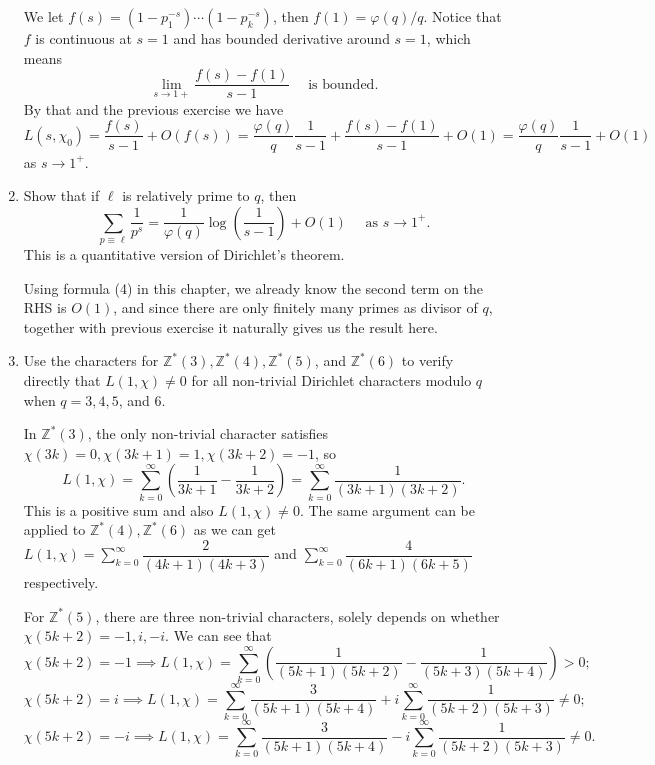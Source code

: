 \documentclass{article}
\begin{document}
\begin{enumerate}
    \begin{solution}
        We let $f(s) = (1-p_1^{-s})\cdots (1-p_k^{-s})$, then $f(1)=\varphi(q)/q$. Notice that $f$ is continuous at $s=1$ and has bounded
        derivative around $s=1$, which means
        $$\lim_{s\to 1+} \dfrac{f(s) - f(1)}{s-1}\quad\text{ is bounded.}$$
        By that and the previous exercise we have
        $$L(s, \chi_0) = \dfrac{f(s)}{s-1} + O(f(s))=\dfrac{\varphi(q)}q \dfrac{1}{s-1} + \dfrac{f(s)-f(1)}{s-1} + O(1)=
            \dfrac{\varphi(q)}q \dfrac{1}{s-1} + O(1)$$
        as $s\to 1^+$.
    \end{solution}
    \item Show that if $\ell$ is relatively prime to $q$, then
    $$\sum_{p\equiv \ell} \dfrac{1}{p^s} = \dfrac1{\varphi(q)}\log\left(\dfrac1{s-1}\right) + O(1) \quad\text{ as } s\to 1^+.$$
    This is a quantitative version of Dirichlet's theorem.

    \begin{solution}
        Using formula (4) in this chapter, we already know the second term on the RHS is $O(1)$, and since there are only finitely many primes as divisor of $q$, together
        with previous exercise it naturally gives us the result here.
    \end{solution}
    \item Use the characters for $\mathbb Z^*(3), \mathbb Z^*(4), \mathbb Z^*(5)$, and $\mathbb Z^*(6)$ to verify
    directly  that $L(1, \chi)\neq 0$ for all non-trivial Dirichlet characters modulo $q$ when
    $q=3,4,5$, and $6$.

    \begin{solution}
        In $\mathbb Z^*(3)$, the only non-trivial character satisfies $\chi(3k)=0, \chi(3k+1)=1, \chi(3k+2)=-1$, so 
        $$L(1, \chi) = \sum_{k=0}^\infty \left(\frac1{3k+1} - \frac1{3k+2}\right) = \sum_{k=0}^\infty \dfrac1{(3k+1)(3k+2)}.$$
        This is a positive sum and also $L(1, \chi) \neq 0$.
        The same argument can be applied to $\mathbb Z^*(4), \mathbb Z^*(6)$ as we can get $L(1, \chi) = \sum_{k=0}^\infty \dfrac2{(4k+1)(4k+3)}$
        and $\sum_{k=0}^\infty \dfrac4{(6k+1)(6k+5)}$ respectively.

        For $\mathbb Z^*(5)$, there are three non-trivial characters, solely depends on whether $\chi(5k+2)=-1, i, -i$.
        We can see that 
        $$\chi(5k+2)=-1 \implies L(1, \chi) = \sum_{k=0}^\infty \left(\dfrac1{(5k+1)(5k+2)} - \dfrac1{(5k+3)(5k+4)}\right) > 0;$$
        $$\chi(5k+2)=i \implies L(1, \chi) = \sum_{k=0}^\infty \dfrac3{(5k+1)(5k+4)} + i\sum_{k=0}^\infty \dfrac1{(5k+2)(5k+3)} \neq 0;$$
        $$\chi(5k+2)=-i \implies L(1, \chi) = \sum_{k=0}^\infty \dfrac3{(5k+1)(5k+4)} - i\sum_{k=0}^\infty \dfrac1{(5k+2)(5k+3)} \neq 0.$$
    \end{solution}
\end{enumerate}
\end{document}
